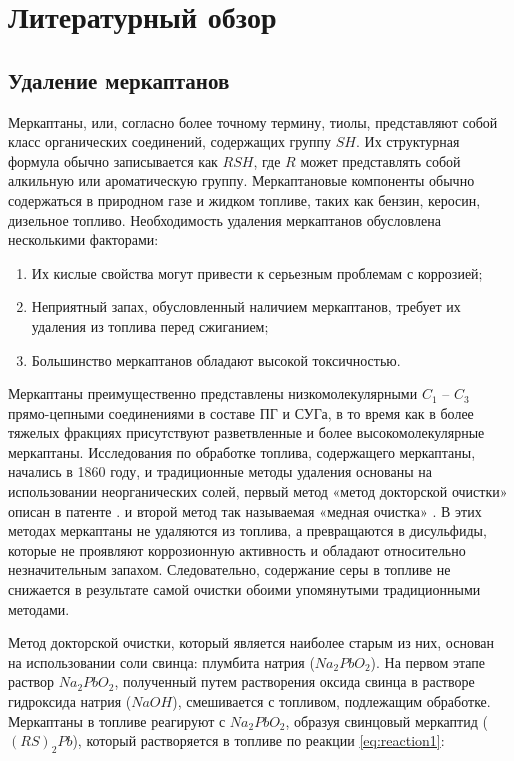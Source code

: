 \chapter{Литературный обзор} \label{ch:ch1}

\section{Удаление меркаптанов} \label{sec:ch1/sec1}

Меркаптаны, или, согласно более точному термину, тиолы, представляют собой класс органических соединений, содержащих группу $SH$. Их структурная формула обычно записывается как $RSH$, где $R$ может представлять собой алкильную или ароматическую группу. Меркаптановые компоненты обычно содержаться в природном газе и жидком топливе, таких как бензин, керосин, дизельное топливо. Необходимость удаления меркаптанов обусловлена несколькими факторами:
	
\begin{enumerate}
	\item Их кислые свойства могут привести к серьезным проблемам с коррозией;
	\item Неприятный запах, обусловленный наличием меркаптанов, требует их удаления из топлива перед сжиганием;
	\item Большинство меркаптанов обладают высокой токсичностью.
\end{enumerate}

Меркаптаны преимущественно представлены низкомолекулярными $C _1$ – $C _3$ прямо-цепными соединениями в составе ПГ и СУГа, в то время как в более тяжелых фракциях присутствуют разветвленные и более высокомолекулярные меркаптаны. Исследования по обработке топлива, содержащего меркаптаны, начались в 1860 году, и традиционные методы удаления основаны на использовании неорганических солей, первый метод «метод докторской очистки» описан в патенте \cite{kalinowski_doctor_1959}. и второй метод так называемая «медная очистка» \cite{krause_color_1952}. В этих методах меркаптаны не удаляются из топлива, а превращаются в дисульфиды, которые не проявляют коррозионную активность и обладают относительно незначительным запахом. Следовательно, содержание серы в топливе не снижается в результате самой очистки обоими упомянутыми традиционными методами.

Метод докторской очистки, который является наиболее старым из них, основан на использовании соли свинца: плумбита натрия ($Na_2PbO_2$). На первом этапе раствор $Na_2PbO_2$, полученный путем растворения оксида свинца в растворе гидроксида натрия ($NaOH$), смешивается с топливом, подлежащим обработке. Меркаптаны в топливе реагируют с $Na_2PbO_2$, образуя свинцовый меркаптид ($(RS)_2Pb$), который растворяется в топливе по реакции \cref{eq:reaction1}:

